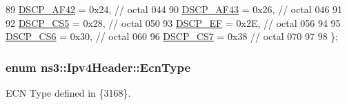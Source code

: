 \begin{DoxyCode}
89       \hyperlink{classns3_1_1Ipv4Header_aaa17802e7732a689311b72d48d1a3450a70499b5aabdcf69b91614d72e14b1af6}{DSCP\_AF42} = 0x24, \textcolor{comment}{// octal 044}
90       \hyperlink{classns3_1_1Ipv4Header_aaa17802e7732a689311b72d48d1a3450a615e936e2c88bc8e0f3d6b86b0a270b2}{DSCP\_AF43} = 0x26, \textcolor{comment}{// octal 046}
91 
92       \hyperlink{classns3_1_1Ipv4Header_aaa17802e7732a689311b72d48d1a3450a92772bf045d4537ab9425d9ef9acda7d}{DSCP\_CS5}  = 0x28, \textcolor{comment}{// octal 050}
93       \hyperlink{classns3_1_1Ipv4Header_aaa17802e7732a689311b72d48d1a3450aadcec8111d0cf2c52e630119cf1df0c4}{DSCP\_EF}   = 0x2E, \textcolor{comment}{// octal 056}
94 
95       \hyperlink{classns3_1_1Ipv4Header_aaa17802e7732a689311b72d48d1a3450ae54a73d59bac8a02403a64ac7aff581d}{DSCP\_CS6}  = 0x30, \textcolor{comment}{// octal 060}
96       \hyperlink{classns3_1_1Ipv4Header_aaa17802e7732a689311b72d48d1a3450acb993cf8813ac30398e426f5d4609b67}{DSCP\_CS7}  = 0x38  \textcolor{comment}{// octal 070}
97 
98     \};
\end{DoxyCode}
\subsubsection[{\texorpdfstring{Ecn\+Type}{EcnType}}]{\setlength{\rightskip}{0pt plus 5cm}enum {\bf ns3\+::\+Ipv4\+Header\+::\+Ecn\+Type}}\hypertarget{classns3_1_1Ipv4Header_a9cec46635fa719f0d58234cf8805991b}{}\label{classns3_1_1Ipv4Header_a9cec46635fa719f0d58234cf8805991b}


E\+CN Type defined in \{3168\}. 

